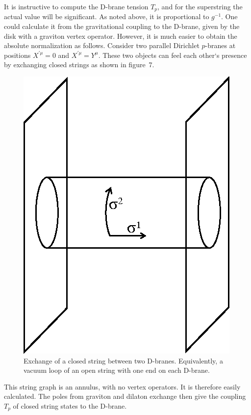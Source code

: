 \documentclass[12pt]{article}
\begin{document}
It is instructive to compute the D-brane tension $T_{p}$, and for the
superstring the actual value will be significant.  As noted above, it is
proportional to
$g^{-1}$.  One could calculate it from the gravitational coupling to the
D-brane, given by the disk with a graviton vertex operator.  However, it
is much easier to obtain the absolute normalization as follows.
Consider two
parallel Dirichlet $p$-branes at positions $X^{\prime\mu}=0$ and
$X^{\prime\mu}=Y^\mu$. These two objects can feel each other`s presence by
exchanging closed strings as shown in figure~7.
\begin{figure}
\begin{center}
\leavevmode
\includegraphics{exch.eps}
\end{center}
\caption[]{Exchange of a closed string between two D-branes. 
Equivalently, a vacuum loop of an open string with one end on each
D-brane.}
\end{figure}
This string graph is an annulus, with no vertex operators.  
It is therefore easily calculated.  The poles from graviton and dilaton
exchange then give the coupling $T_p$ of closed string states to the
D-brane.
\end{document}
